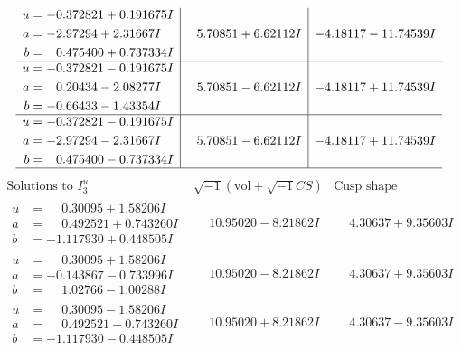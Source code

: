 \documentclass[1p]{elsarticle_modified}
\theoremstyle{definition}
\newcommand{\I}{\sqrt{-1}}
\begin{document}
$$\begin{array}{c|c|c}
\begin{aligned}
u &= -0.372821 + 0.191675 I \\
a &= -2.97294 + 2.31667 I \\
b &= \phantom{-}0.475400 + 0.737334 I\end{aligned}
 & \phantom{-}5.70851 + 6.62112 I & -4.18117 - 11.74539 I \\ \hline\begin{aligned}
u &= -0.372821 - 0.191675 I \\
a &= \phantom{-}0.20434 - 2.08277 I \\
b &= -0.66433 - 1.43354 I\end{aligned}
 & \phantom{-}5.70851 - 6.62112 I & -4.18117 + 11.74539 I \\ \hline\begin{aligned}
u &= -0.372821 - 0.191675 I \\
a &= -2.97294 - 2.31667 I \\
b &= \phantom{-}0.475400 - 0.737334 I\end{aligned}
 & \phantom{-}5.70851 - 6.62112 I & -4.18117 + 11.74539 I\\
 \hline 
 \end{array}$$\newpage$$\begin{array}{c|c|c}  
\text{Solutions to }I^u_{3}& \I (\text{vol} + \sqrt{-1}CS) & \text{Cusp shape}\\
 \hline 
\begin{aligned}
u &= \phantom{-}0.30095 + 1.58206 I \\
a &= \phantom{-}0.492521 + 0.743260 I \\
b &= -1.117930 + 0.448505 I\end{aligned}
 & \phantom{-}10.95020 - 8.21862 I & \phantom{-}4.30637 + 9.35603 I \\ \hline\begin{aligned}
u &= \phantom{-}0.30095 + 1.58206 I \\
a &= -0.143867 - 0.733996 I \\
b &= \phantom{-}1.02766 - 1.00288 I\end{aligned}
 & \phantom{-}10.95020 - 8.21862 I & \phantom{-}4.30637 + 9.35603 I \\ \hline\begin{aligned}
u &= \phantom{-}0.30095 - 1.58206 I \\
a &= \phantom{-}0.492521 - 0.743260 I \\
b &= -1.117930 - 0.448505 I\end{aligned}
 & \phantom{-}10.95020 + 8.21862 I & \phantom{-}4.30637 - 9.35603 I \\ \hline\begin{aligned}

\end{aligned}
\end{array}$$
\end{document}
